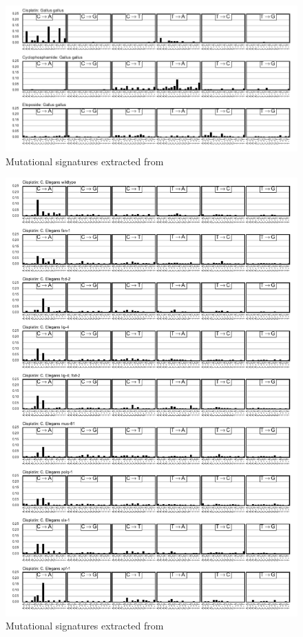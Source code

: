 \begin{figure}
\centering
\includegraphics[scale=1.0]{figures/extracted_signatures_chicken.pdf}
\caption{Mutational signatures extracted from \cite{Szikriszt_2016}}
\label{fig:supp_extracted_signatures_chicken}
\end{figure}

\begin{figure}
\centering
\includegraphics[scale=1.0]{figures/extracted_signatures_worm.pdf}
\caption{Mutational signatures extracted from \cite{Meier_2014}}
\label{fig:supp_extracted_signatures_worm}
\end{figure}

\FloatBarrier
